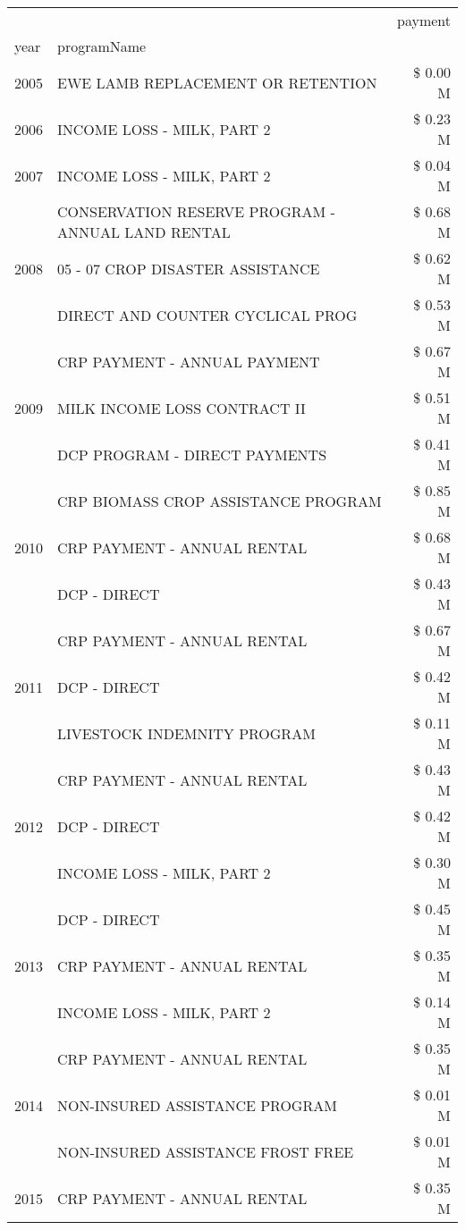 \begin{tabular}{llr}
\toprule
 &  & payment \\
year & programName &  \\
\midrule
2005 & EWE LAMB REPLACEMENT OR RETENTION & \$ 0.00 M \\
\cline{1-3}
2006 & INCOME LOSS - MILK, PART 2 & \$ 0.23 M \\
\cline{1-3}
2007 & INCOME LOSS - MILK, PART 2 & \$ 0.04 M \\
\cline{1-3}
\multirow[t]{3}{*}{2008} & CONSERVATION RESERVE PROGRAM - ANNUAL LAND RENTAL & \$ 0.68 M \\
 & 05 - 07 CROP DISASTER ASSISTANCE & \$ 0.62 M \\
 & DIRECT AND COUNTER CYCLICAL PROG & \$ 0.53 M \\
\cline{1-3}
\multirow[t]{3}{*}{2009} & CRP PAYMENT - ANNUAL PAYMENT & \$ 0.67 M \\
 & MILK INCOME LOSS CONTRACT II & \$ 0.51 M \\
 & DCP PROGRAM - DIRECT PAYMENTS & \$ 0.41 M \\
\cline{1-3}
\multirow[t]{3}{*}{2010} & CRP BIOMASS CROP ASSISTANCE PROGRAM & \$ 0.85 M \\
 & CRP PAYMENT - ANNUAL RENTAL & \$ 0.68 M \\
 & DCP - DIRECT & \$ 0.43 M \\
\cline{1-3}
\multirow[t]{3}{*}{2011} & CRP PAYMENT - ANNUAL RENTAL & \$ 0.67 M \\
 & DCP - DIRECT & \$ 0.42 M \\
 & LIVESTOCK INDEMNITY PROGRAM & \$ 0.11 M \\
\cline{1-3}
\multirow[t]{3}{*}{2012} & CRP PAYMENT - ANNUAL RENTAL & \$ 0.43 M \\
 & DCP - DIRECT & \$ 0.42 M \\
 & INCOME LOSS - MILK, PART 2 & \$ 0.30 M \\
\cline{1-3}
\multirow[t]{3}{*}{2013} & DCP - DIRECT & \$ 0.45 M \\
 & CRP PAYMENT - ANNUAL RENTAL & \$ 0.35 M \\
 & INCOME LOSS - MILK, PART 2 & \$ 0.14 M \\
\cline{1-3}
\multirow[t]{3}{*}{2014} & CRP PAYMENT - ANNUAL RENTAL & \$ 0.35 M \\
 & NON-INSURED ASSISTANCE PROGRAM & \$ 0.01 M \\
 & NON-INSURED ASSISTANCE FROST FREE & \$ 0.01 M \\
\cline{1-3}
\multirow[t]{3}{*}{2015} & CRP PAYMENT - ANNUAL RENTAL & \$ 0.35 M \\

\end{tabular}
